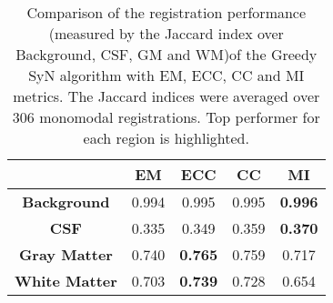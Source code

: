 \begin{table}[htbp]
  \centering
  {\small
    \begin{tabular}{ccccc}
    \toprule
    \textbf{} & \textbf{EM} & \textbf{ECC} & \textbf{CC} & \multicolumn{1}{c}{\textbf{MI}} \\
    \midrule
    \textbf{Background} & 0.994 & 0.995 & 0.995 & \textbf{0.996} \\
    \textbf{CSF} & 0.335 & 0.349 & 0.359 & \textbf{0.370} \\
    \textbf{Gray Matter} & 0.740 & \textbf{0.765} & 0.759 & 0.717 \\
    \textbf{White Matter} & 0.703 & \textbf{0.739} & 0.728 & 0.654 \\
    \bottomrule
    \end{tabular}%
    \caption{{\small Comparison of the registration performance (measured by the Jaccard index over Background, CSF, GM and WM)of the Greedy SyN algorithm with EM, ECC, CC and MI metrics. The Jaccard indices were averaged over 306 monomodal registrations. Top performer for each region is highlighted.}}
  \label{tab:monomodal_results_segTri_fill}}%
\end{table}%
